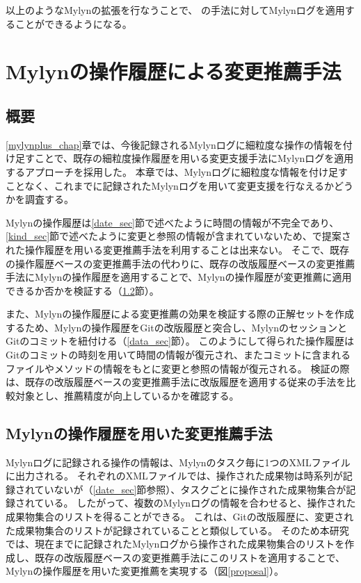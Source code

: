 \documentclass[a4paper]{jsbook}
\begin{document}
以上のようなMylynの拡張を行なうことで、
\cite{6233415,KatoJapanese:2011,ss2012-76,ss2013-84,Yamamori:2016}の手法に対してMylynログを適用することができるようになる。

\chapter{Mylynの操作履歴による変更推薦手法}\label{experiment_chap}
\section{概要}
\ref{mylynplus_chap}章では、今後記録されるMylynログに細粒度な操作の情報を付け足すことで、既存の細粒度操作履歴を用いる変更支援手法にMylynログを適用するアプローチを採用した。
本章では、Mylynログに細粒度な情報を付け足すことなく、これまでに記録されたMylynログを用いて変更支援を行なえるかどうかを調査する。

Mylynの操作履歴は\ref{date_sec}節で述べたように時間の情報が不完全であり、\ref{kind_sec}節で述べたように変更と参照の情報が含まれていないため、\cite{6233415}で提案された操作履歴を用いる変更推薦手法を利用することは出来ない。
そこで、既存の操作履歴ベースの変更推薦手法の代わりに、既存の改版履歴ベースの変更推薦手法にMylynの操作履歴を適用することで、Mylynの操作履歴が変更推薦に適用できるか否かを検証する（\ref{method_sec}節）。

また、Mylynの操作履歴による変更推薦の効果を検証する際の正解セットを作成するため、Mylynの操作履歴をGitの改版履歴と突合し、MylynのセッションとGitのコミットを紐付ける（\ref{data_sec}節）。
このようにして得られた操作履歴はGitのコミットの時刻を用いて時間の情報が復元され、またコミットに含まれるファイルやメソッドの情報をもとに変更と参照の情報が復元される。
検証の際は、既存の改版履歴ベースの変更推薦手法に改版履歴を適用する従来の手法を比較対象とし、推薦精度が向上しているかを確認する。


\section{Mylynの操作履歴を用いた変更推薦手法}\label{method_sec}
Mylynログに記録される操作の情報は、Mylynのタスク毎に1つのXMLファイルに出力される。
それぞれのXMLファイルでは、操作された成果物は時系列が記録されていないが（\ref{date_sec}節参照）、タスクごとに操作された成果物集合が記録されている。
したがって、複数のMylynログの情報を合わせると、操作された成果物集合のリストを得ることができる。
これは、Gitの改版履歴に、変更された成果物集合のリストが記録されていることと類似している。
そのため本研究では、現在までに記録されたMylynログから操作された成果物集合のリストを作成し、既存の改版履歴ベースの変更推薦手法にこのリストを適用することで、Mylynの操作履歴を用いた変更推薦を実現する（図\ref{proposal}）。
\end{document}
